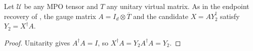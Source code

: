 \begin{lemma}
    \label{thm:mpug_inverse_endpoint_recovery}
    \leanok
    Let $\mathcal U$ be any MPO tensor and $T$ any unitary virtual
    matrix. As in the endpoint recovery of
    \cite[line~5432]{FrancoRubio2025MPUGauging}, the gauge matrix
    $A=I_d\otimes\overline T$ and the candidate $X=AY_2^\dagger$ satisfy
    $Y_2=X^\dagger A$.
\end{lemma}
\begin{proof}\leanok
    Unitarity gives $A^\dagger A=I$, so
    $X^\dagger A=Y_2A^\dagger A=Y_2$.
\end{proof}

